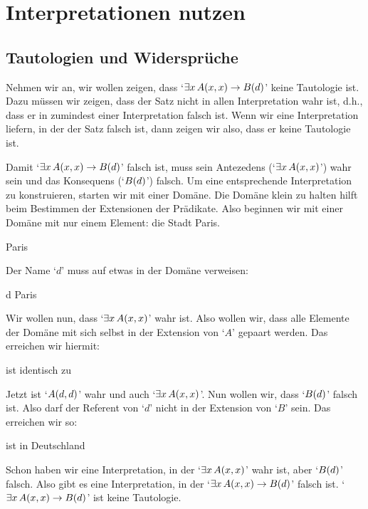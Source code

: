 \chapter{Interpretationen nutzen}
\label{sec.UsingModels}

\section{Tautologien und Widersprüche}
Nehmen wir an, wir wollen zeigen, dass `$\exists x\, \mathord{A}(x,x) \rightarrow \mathord{B}(d)$' keine Tautologie ist. Dazu müssen wir zeigen, dass der Satz nicht in allen Interpretation wahr ist, d.h.\@, dass er in zumindest einer Interpretation falsch ist. Wenn wir eine Interpretation liefern, in der der Satz falsch ist, dann zeigen wir also, dass er keine Tautologie ist.

Damit `$\exists x\,\mathord{A}(x,x) \rightarrow \mathord{B}(d)$' falsch ist, muss sein Antezedens (`$\exists x\, \mathord{A}(x,x)$') wahr sein und das Konsequens (`$\mathord{B}(d)$') falsch. Um eine entsprechende Interpretation zu konstruieren, starten wir mit einer Domäne. Die Domäne klein zu halten hilft beim Bestimmen der Extensionen der Prädikate. Also beginnen wir mit einer Domäne mit nur einem Element: die Stadt Paris. 
	\begin{ekey}
		\item[\text{Domäne}] Paris
	\end{ekey}
Der Name `$d$' muss auf etwas in der Domäne verweisen:
	\begin{ekey}
		\item[d] Paris
	\end{ekey}
Wir wollen nun, dass `$\exists x\, \mathord{A}(x,x)$' wahr ist. Also wollen wir, dass alle Elemente der Domäne mit sich selbst in der Extension von `$A$' gepaart werden. Das erreichen wir hiermit:
	\begin{ekey}
		\item[\atom{A}{x,y}]  ist identisch zu 
	\end{ekey}
Jetzt ist `$\mathord{A}(d,d)$' wahr und auch `$\exists x\, \mathord{A}(x,x)$'. Nun wollen wir, dass `$\mathord{B}(d)$' falsch ist. Also darf der Referent von `$d$' nicht in der Extension von `$B$' sein. Das erreichen wir so:
	\begin{ekey}
		\item[\atom{B}{x}]  ist in Deutschland
	\end{ekey}
Schon haben wir eine Interpretation, in der `$\exists x\, \mathord{A}(x,x)$' wahr ist, aber `$\mathord{B}(d)$' falsch. Also gibt es eine Interpretation, in der `$\exists x\, \mathord{A}(x,x) \rightarrow \mathord{B}(d)$' falsch ist. `$\exists x\, \mathord{A}(x,x) \rightarrow \mathord{B}(d)$' ist keine Tautologie.

